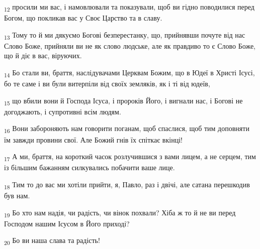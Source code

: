 \begin{tcolorbox}
\textsubscript{12} просили ми вас, і намовлювали та показували, щоб ви гідно поводилися перед Богом, що покликав вас у Своє Царство та в славу.
\end{tcolorbox}
\begin{tcolorbox}
\textsubscript{13} Тому то й ми дякуємо Богові безперестанку, що, прийнявши почуте від нас Слово Боже, прийняли ви не як слово людське, але як правдиво то є Слово Боже, що й діє в вас, віруючих.
\end{tcolorbox}
\begin{tcolorbox}
\textsubscript{14} Бо стали ви, браття, наслідувачами Церквам Божим, що в Юдеї в Христі Ісусі, бо те саме і ви були витерпіли від своїх земляків, як і ті від юдеїв,
\end{tcolorbox}
\begin{tcolorbox}
\textsubscript{15} що вбили вони й Господа Ісуса, і пророків Його, і вигнали нас, і Богові не догоджають, і супротивні всім людям.
\end{tcolorbox}
\begin{tcolorbox}
\textsubscript{16} Вони забороняють нам говорити поганам, щоб спаслися, щоб тим доповняти їм завжди провини свої. Але Божий гнів їх спіткає вкінці!
\end{tcolorbox}
\begin{tcolorbox}
\textsubscript{17} А ми, браття, на короткий часок розлучившися з вами лицем, а не серцем, тим із більшим бажанням силкувались побачити ваше лице.
\end{tcolorbox}
\begin{tcolorbox}
\textsubscript{18} Тим то до вас ми хотіли прийти, я, Павло, раз і двічі, але сатана перешкодив був нам.
\end{tcolorbox}
\begin{tcolorbox}
\textsubscript{19} Бо хто нам надія, чи радість, чи вінок похвали? Хіба ж то й не ви перед Господом нашим Ісусом в Його приході?
\end{tcolorbox}
\begin{tcolorbox}
\textsubscript{20} Бо ви наша слава та радість!
\end{tcolorbox}

